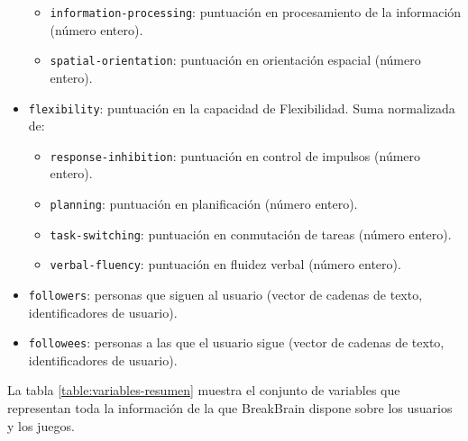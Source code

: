 \begin{itemize}
\begin{itemize}
  \item {\tt information-processing}: puntuación en procesamiento de la información (número entero).
  \item {\tt spatial-orientation}: puntuación en orientación espacial (número entero).
  \end{itemize}
\item {\tt flexibility}: puntuación en la capacidad de Flexibilidad. Suma normalizada de:
  \begin{itemize}
  \item {\tt response-inhibition}: puntuación en control de impulsos (número entero).
  \item {\tt planning}: puntuación en planificación (número entero).
  \item {\tt task-switching}: puntuación en conmutación de tareas (número entero).
  \item {\tt verbal-fluency}: puntuación en fluidez verbal (número entero).
  \end{itemize}
\item {\tt followers}: personas que siguen al usuario (vector de cadenas de texto, identificadores de usuario).
\item {\tt followees}: personas a las que el usuario sigue (vector de cadenas de texto, identificadores de usuario).
\end{itemize}

La tabla \ref{table:variables-resumen} muestra el conjunto de variables que representan toda la información de la que BreakBrain dispone sobre los usuarios y los juegos.


